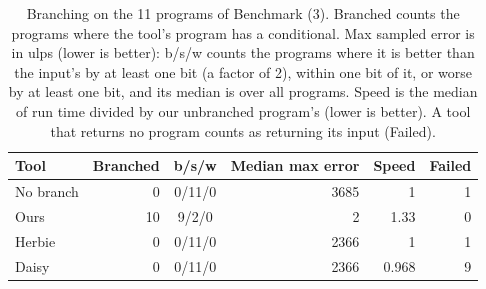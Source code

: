 \begin{table}[H] \centering \small
\caption{Branching on the 11 programs of Benchmark (3). Branched counts the programs where the tool's program has a conditional. Max sampled error is in ulps (lower is better): b/s/w counts the programs where it is better than the input's by at least one bit (a factor of 2), within one bit of it, or worse by at least one bit, and its median is over all programs. Speed is the median of run time divided by our unbranched program's (lower is better). A tool that returns no program counts as returning its input (Failed).}\label{tab:branching}
\begin{tabular}{lrcrrr}
\toprule
Tool & Branched & b/s/w & Median max error & Speed & Failed \\
\midrule
No branch & 0 & 0/11/0 & 3685 & 1 & 1 \\
Ours & 10 & 9/2/0 & 2 & 1.33 & 0 \\
Herbie & 0 & 0/11/0 & 2366 & 1 & 1 \\
Daisy & 0 & 0/11/0 & 2366 & 0.968 & 9 \\
\bottomrule
\end{tabular}
\end{table}
